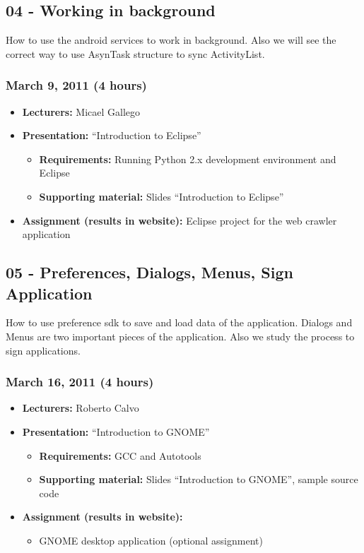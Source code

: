 \documentclass[a4paper]{article}
\begin{document}
\subsection{04 - Working in background }

How to use the android services to work in background. Also we will
see the correct way to use AsynTask structure to sync ActivityList.

\subsubsection{March 9, 2011 (4 hours)}

\begin{itemize}
\item \textbf{Lecturers:} Micael Gallego
\item \textbf{Presentation:} ``Introduction to Eclipse''
  \begin{itemize}
\item \textbf{Requirements:} Running Python 2.x development
  environment and Eclipse
  \item \textbf{Supporting material:} Slides ``Introduction to Eclipse''
  \end{itemize}
\item \textbf{Assignment (results in website):} Eclipse project for
  the web crawler application
\end{itemize}

\subsection{05 - Preferences, Dialogs, Menus, Sign Application}

How to use preference sdk to save and load data of the
application. Dialogs and Menus are two important pieces of the
application. Also we study the process to sign applications.

\subsubsection{March 16, 2011 (4 hours)}

\begin{itemize}
\item \textbf{Lecturers:} Roberto Calvo
\item \textbf{Presentation:} ``Introduction to GNOME''
  \begin{itemize}
  \item \textbf{Requirements:} GCC and Autotools
  \item \textbf{Supporting material:} Slides ``Introduction to
    GNOME'', sample source code 
  \end{itemize}
\item \textbf{Assignment (results in website):} 
  \begin{itemize}
  \item GNOME desktop application (optional assignment)
  \end{itemize}
\end{itemize}
\end{document}
